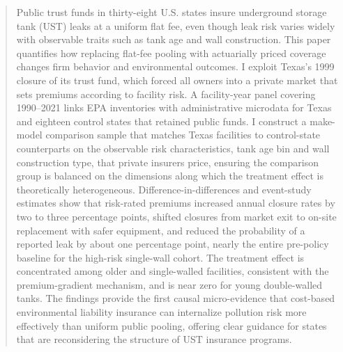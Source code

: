 \begin{quote}
{\small \noindent Public trust funds in thirty-eight U.S. states insure underground storage tank
(UST) leaks at a uniform flat fee, even though leak risk varies widely with observable
traits such as tank age and wall construction. This paper quantifies how replacing
flat-fee pooling with actuarially priced coverage changes firm behavior and environmental
outcomes. I exploit Texas's 1999 closure of its trust fund, which forced all owners into
a private market that sets premiums according to facility risk. A facility-year panel
covering 1990--2021 links EPA inventories with administrative microdata for Texas and
eighteen control states that retained public funds. I construct a make-model comparison
sample that matches Texas facilities to control-state counterparts on the observable risk
characteristics, tank age bin and wall construction type, that private insurers price,
ensuring the comparison group is balanced on the dimensions along which the treatment
effect is theoretically heterogeneous. Difference-in-differences and event-study estimates
show that risk-rated premiums increased annual closure rates by two to three percentage
points, shifted closures from market exit to on-site replacement with safer equipment,
and reduced the probability of a reported leak by about one percentage point, nearly the
entire pre-policy baseline for the high-risk single-wall cohort. The treatment effect is
concentrated among older and single-walled facilities, consistent with the
premium-gradient mechanism, and is near zero for young double-walled tanks. The findings
provide the first causal micro-evidence that cost-based environmental liability insurance
can internalize pollution risk more effectively than uniform public pooling, offering
clear guidance for states that are reconsidering the structure of UST insurance programs.}
\end{quote}

\renewcommand{\thefootnote}{\arabic{footnote}}
\setcounter{footnote}{0}

\newpage
